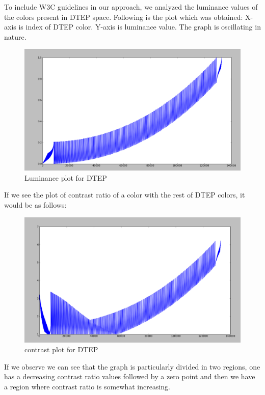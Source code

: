 To include W3C guidelines in our approach, we analyzed the luminance values of the colors present in DTEP space. Following is the plot which was obtained: X-axis is index of DTEP color. Y-axis is luminance value. The graph is oscillating in nature.
\begin{figure}[!htb]
\centering
\includegraphics[width=\linewidth]{luminanceDTEP.png}
\caption{Luminance plot for DTEP}
\label{fig:LuminancePlot}
\end{figure} 

If we see the plot of contrast ratio of a color with the rest of DTEP colors, it would be as follows:
\begin{figure}[!htb]
\centering
\includegraphics[width=\linewidth]{contrastDTEP.png}
\caption{contrast plot for DTEP}
\label{fig:ContrastPlot}
\end{figure}
If we observe we can see that the graph is particularly divided in two regions, one has a decreasing contrast ratio values followed by a zero point and then we have a region where contrast ratio is somewhat increasing. 


